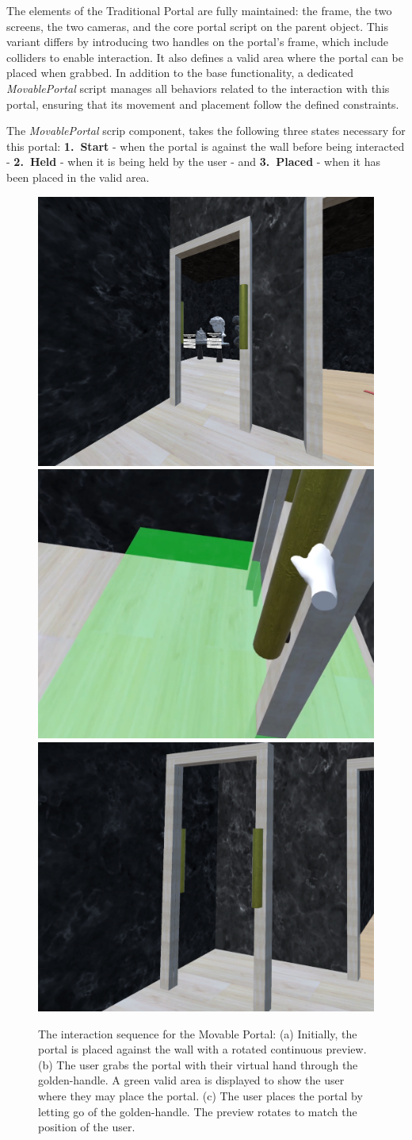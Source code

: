 The elements of the Traditional Portal are fully maintained: the frame, the two screens, the two cameras, and the core portal script 
on the parent object. This variant differs by introducing two handles on the portal's frame, which include colliders to enable interaction.
It also defines a valid area where the portal can be placed when grabbed. In addition to the base functionality, a dedicated
\textit{MovablePortal} script manages all behaviors related to the interaction with this portal, ensuring that its movement and placement 
follow the defined constraints.

The \textit{MovablePortal} scrip component, takes the following three states necessary for this portal: \textbf{1.~Start} - when the portal is 
against the wall before being interacted - \textbf{2.~Held} - when it is being held by the user - and \textbf{3.~Placed} - when it has been 
placed in the valid area.
\begin{figure}[t]
    \centering
    \mbox{} \hfill
    \includegraphics[width=.45\linewidth]{NOVAthesisFiles/Images/screenshots/mov-portal-a.png}
    \hfill
    \includegraphics[width=.45\linewidth]{NOVAthesisFiles/Images/screenshots/mov-portal-b.png}
    \hfill \mbox{}
    \includegraphics[width=.45\linewidth]{NOVAthesisFiles/Images/screenshots/mov-portal-c.png}
    \caption{The interaction sequence for the Movable Portal: (a) Initially, the portal is placed against the wall with a rotated continuous preview. (b) The user grabs the portal with their virtual hand through the golden-handle. A green valid area is displayed to show the user where they may place the portal. (c) The user places the portal by letting go of the golden-handle. The preview rotates to match the position of the user.}
  \label{fig:mov-portal-sc}
\end{figure}


